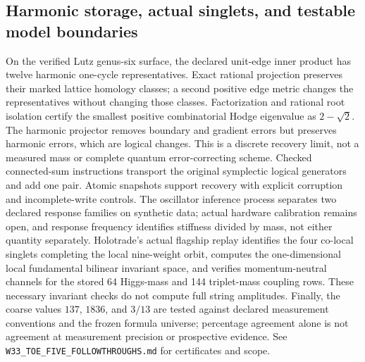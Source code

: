\subsection{Harmonic storage, actual singlets, and testable model boundaries}
On the verified Lutz genus-six surface, the declared unit-edge inner product
has twelve harmonic one-cycle representatives. Exact rational projection
preserves their marked lattice homology classes; a second positive edge
metric changes the representatives without changing those classes.
Factorization and rational root isolation certify the smallest positive
combinatorial Hodge eigenvalue as $2-\sqrt{2}$. The harmonic projector removes
boundary and gradient errors but preserves harmonic errors, which are logical
changes. This is a discrete recovery limit, not a measured mass or complete
quantum error-correcting scheme.
Checked connected-sum instructions transport the original symplectic logical
generators and add one pair. Atomic snapshots support recovery with explicit
corruption and incomplete-write controls. The oscillator inference process
separates two declared response families on synthetic data; actual hardware
calibration remains open, and response frequency identifies stiffness divided
by mass, not either quantity separately.
Holotrade's actual flagship replay identifies the four co-local singlets
completing the local nine-weight orbit, computes the one-dimensional local
fundamental bilinear invariant space, and verifies momentum-neutral channels
for the stored 64 Higgs-mass and 144 triplet-mass coupling rows. These necessary
invariant checks do not compute full string amplitudes.
Finally, the coarse values $137$, $1836$, and $3/13$ are tested against declared
measurement conventions and the frozen formula universe; percentage agreement
alone is not agreement at measurement precision or prospective evidence.
See \texttt{W33\_TOE\_FIVE\_FOLLOWTHROUGHS.md} for certificates and scope.
